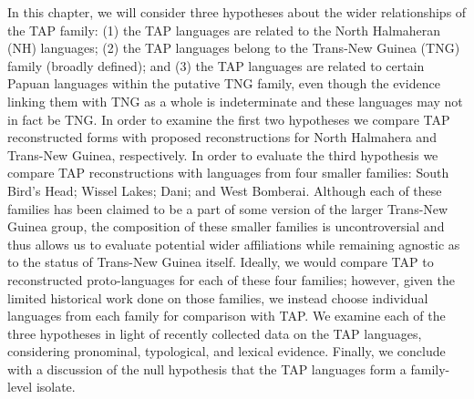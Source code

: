 In this chapter, we will consider three hypotheses about the wider relationships of the TAP family: (1) the TAP languages are related to the North Halmaheran (NH) languages; (2) the TAP languages belong to the Trans-New Guinea (TNG) family (broadly defined); and (3) the TAP languages are related to certain Papuan languages within the putative TNG family, even though the evidence linking them with TNG as a whole is indeterminate and these languages may not in fact be TNG. In order to examine the first two hypotheses we compare TAP reconstructed forms with proposed reconstructions for North Halmahera and Trans-New Guinea, respectively. In order to evaluate the third hypothesis we compare TAP reconstructions with languages from four smaller families: South Bird's Head; Wissel Lakes; Dani; and West Bomberai. Although each of these families has been claimed to be a part of some version of the larger Trans-New Guinea group, the composition of these smaller families is uncontroversial and thus allows us to evaluate
potential wider affiliations while remaining agnostic as to the status of Trans-New Guinea itself. Ideally, we would compare TAP to reconstructed proto-languages for each of these four families; however, given the limited historical work done on those families, we instead choose individual languages from each family for comparison with TAP. We examine each of the three hypotheses in light of recently collected data on the TAP languages, considering pronominal, typological, and lexical evidence. Finally, we conclude with a discussion of the null hypothesis that the TAP languages form a family-level isolate.

